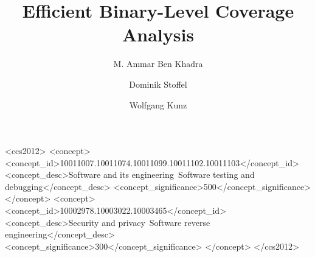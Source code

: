 {%



\date{}

\title{Efficient Binary-Level Coverage Analysis}

\author{M. Ammar Ben Khadra}

\author{Dominik Stoffel}

\author{Wolfgang Kunz}





\begin{CCSXML}
    <ccs2012>
    <concept>
    <concept_id>10011007.10011074.10011099.10011102.10011103</concept_id>
    <concept_desc>Software and its engineering~Software testing and debugging</concept_desc>
    <concept_significance>500</concept_significance>
    </concept>
    <concept>
    <concept_id>10002978.10003022.10003465</concept_id>
    <concept_desc>Security and privacy~Software reverse engineering</concept_desc>
    <concept_significance>300</concept_significance>
    </concept>
    </ccs2012>
\end{CCSXML}


}
